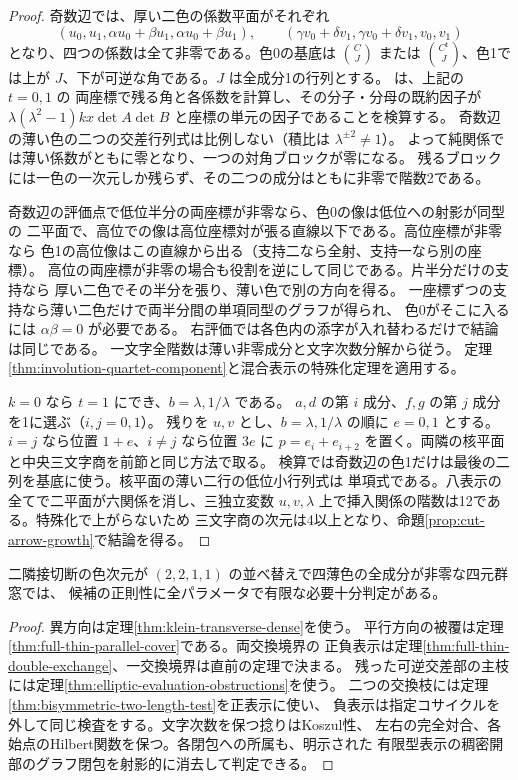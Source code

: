 \begin{proof}
奇数辺では、厚い二色の係数平面がそれぞれ
\[
 (u_0,u_1,\alpha u_0+\beta u_1,\alpha u_0+\beta u_1),\qquad
 (\gamma v_0+\delta v_1,\gamma v_0+\delta v_1,v_0,v_1)
\]
となり、四つの係数は全て非零である。色0の基底は $\binom{C}{J}$ または
$\binom{C^{\mathsf t}}{J}$、色1では上が $J$、下が可逆な角である。$J$ は全成分1の行列とする。
 は、上記の $t=0,1$ の
両座標で残る角と各係数を計算し、その分子・分母の既約因子が
$\lambda(\lambda^2-1)kx\det A\det B$ と座標の単元の因子であることを検算する。
奇数辺の薄い色の二つの交差行列式は比例しない（積比は $\lambda^{\pm2}\ne1$）。
よって純関係では薄い係数がともに零となり、一つの対角ブロックが零になる。
残るブロックには一色の一次元しか残らず、その二つの成分はともに非零で階数2である。

奇数辺の評価点で低位半分の両座標が非零なら、色0の像は低位への射影が同型の
二平面で、高位での像は高位座標対が張る直線以下である。高位座標が非零なら
色1の高位像はこの直線から出る（支持二なら全射、支持一なら別の座標）。
高位の両座標が非零の場合も役割を逆にして同じである。片半分だけの支持なら
厚い二色でその半分を張り、薄い色で別の方向を得る。
一座標ずつの支持なら薄い二色だけで両半分間の単項同型のグラフが得られ、
色0がそこに入るには $\alpha\beta=0$ が必要である。
右評価では各色内の添字が入れ替わるだけで結論は同じである。
一文字全階数は薄い非零成分と文字次数分解から従う。
定理\ref{thm:involution-quartet-component}と混合表示の特殊化定理を適用する。

$k=0$ なら $t=1$ にでき、$b=\lambda,1/\lambda$ である。
$a,d$ の第 $i$ 成分、$f,g$ の第 $j$ 成分を1に選ぶ（$i,j=0,1$）。
残りを $u,v$ とし、$b=\lambda,1/\lambda$ の順に $e=0,1$ とする。
$i=j$ なら位置 $1+e$、$i\ne j$ なら位置 $3e$ に
$p=e_i+e_{i+2}$ を置く。両隣の核平面と中央三文字商を前節と同じ方法で取る。
検算では奇数辺の色1だけは最後の二列を基底に使う。核平面の薄い二行の低位小行列式は
単項式である。八表示の全てで二平面が六関係を消し、三独立変数
$u,v,\lambda$ 上で挿入関係の階数は12である。特殊化で上がらないため
三文字商の次元は4以上となり、命題\ref{prop:cut-arrow-growth}で結論を得る。
\end{proof}

\begin{corollary}\label{cor:regular-full-thin-all-pairings}
二隣接切断の色次元が $(2,2,1,1)$ の並べ替えで四薄色の全成分が非零な四元群窓では、
候補の正則性に全パラメータで有限な必要十分判定がある。
\end{corollary}
\begin{proof}
異方向は定理\ref{thm:klein-transverse-dense}を使う。
平行方向の被覆は定理\ref{thm:full-thin-parallel-cover}である。両交換境界の
正負表示は定理\ref{thm:full-thin-double-exchange}、一交換境界は直前の定理で決まる。
残った可逆交差部の主枝には定理\ref{thm:elliptic-evaluation-obstructions}を使う。
二つの交換枝には定理\ref{thm:bisymmetric-two-length-test}を正表示に使い、
負表示は指定コサイクルを外して同じ検査をする。文字次数を保つ捻りはKoszul性、
左右の完全対合、各始点のHilbert関数を保つ。各閉包への所属も、明示された
有限型表示の稠密開部のグラフ閉包を射影的に消去して判定できる。
\end{proof}
